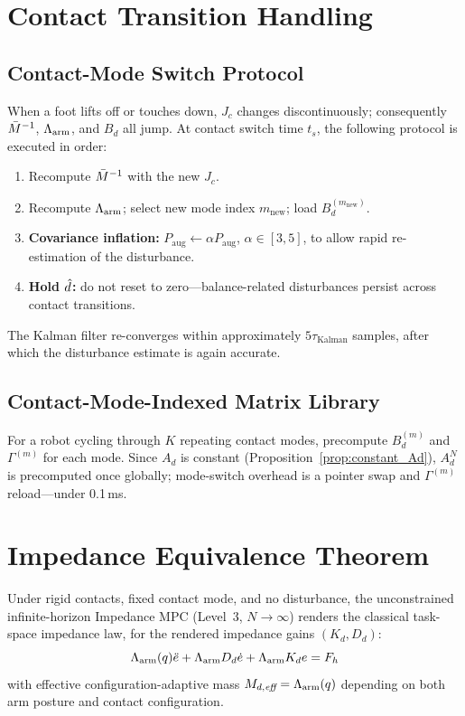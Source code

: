 \section{Contact Transition Handling}\label{sec:switching}

\subsection{Contact-Mode Switch Protocol}

When a foot lifts off or touches down, $J_c$ changes discontinuously;
consequently $\bar{M}^{-1}$, $\Lambda_{\text{arm}}$, and $B_d$ all jump.
At contact switch time $t_s$, the following protocol is executed in order:
\begin{enumerate}
  \item Recompute $\bar{M}^{-1}$ with the new $J_c$.
  \item Recompute $\Lambda_{\text{arm}}$; select new mode index $m_{\text{new}}$; load $B_d^{(m_{\text{new}})}$.
  \item \textbf{Covariance inflation:} $P_{\text{aug}}\leftarrow\alpha P_{\text{aug}}$,
        $\alpha\in[3,5]$, to allow rapid re-estimation of the disturbance.
  \item \textbf{Hold $\hat{d}$:} do not reset to zero---balance-related
        disturbances persist across contact transitions.
\end{enumerate}
The Kalman filter re-converges within approximately $5\tau_{\text{Kalman}}$
samples, after which the disturbance estimate is again accurate.

\subsection{Contact-Mode-Indexed Matrix Library}

For a robot cycling through $K$ repeating contact modes, precompute
$B_d^{(m)}$ and $\Gamma^{(m)}$ for each mode.
Since $A_d$ is constant (Proposition~\ref{prop:constant_Ad}), $A_d^N$ is
precomputed once globally; mode-switch overhead is a pointer swap and
$\Gamma^{(m)}$ reload---under 0.1\,ms.

\section{Impedance Equivalence Theorem}\label{sec:theorem}

\begin{theorem}\label{thm:equivalence}
Under rigid contacts, fixed contact mode, and no disturbance, the
unconstrained infinite-horizon Impedance MPC (Level~3, $N\to\infty$)
renders the classical task-space impedance law, for the rendered impedance
gains $(K_d,D_d)$:
\begin{equation}\label{eq:impedance}
  \Lambda_{\text{arm}}(q)\ddot{e}+\Lambda_{\text{arm}} D_d\dot{e}+\Lambda_{\text{arm}} K_d e = F_h
\end{equation}
with effective configuration-adaptive mass $M_{d,\emph{eff}}=\Lambda_{\text{arm}}(q)$
depending on both arm posture and contact configuration.
\end{theorem}

